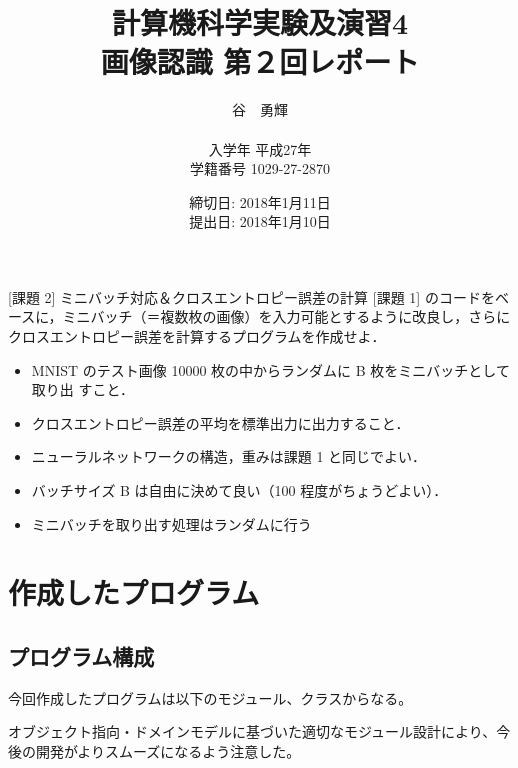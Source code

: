 \documentclass{ujarticle} %
\begin{document}
\title{計算機科学実験及演習4 \\ \bf 画像認識 第２回レポート}
\author{谷　勇輝 \\ \\入学年 平成27年 \\ 学籍番号 1029-27-2870}
\date{締切日: 2018年1月11日\\ 提出日: 2018年1月10日}
\maketitle
\newpage


\begin{itembox}[l]{[課題 2] ミニバッチ対応＆クロスエントロピー誤差の計算}
  [課題 1] のコードをベースに，ミニバッチ（＝複数枚の画像）を入力可能とするように改良し，さらにクロスエントロピー誤差を計算するプログラムを作成せよ．
  \begin{itemize}
    \item MNIST のテスト画像 10000 枚の中からランダムに B 枚をミニバッチとして取り出
    すこと．
    \item クロスエントロピー誤差の平均を標準出力に出力すること．
    \item ニューラルネットワークの構造，重みは課題 1 と同じでよい．
    \item バッチサイズ B は自由に決めて良い（100 程度がちょうどよい）．
    \item ミニバッチを取り出す処理はランダムに行う
  \end{itemize}
\end{itembox}

\section{作成したプログラム}
\subsection{プログラム構成}
今回作成したプログラムは以下のモジュール、クラスからなる。

オブジェクト指向・ドメインモデルに基づいた適切なモジュール設計により、今後の開発がよりスムーズになるよう注意した。
\end{document}
